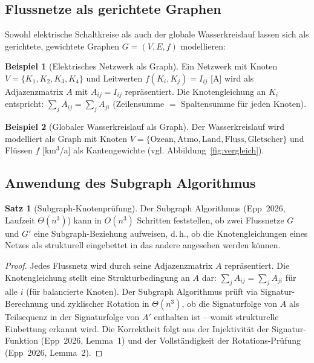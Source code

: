 ﻿\documentclass[a4paper,12pt]{article}
\theoremstyle{definition}
\newtheorem{beispiel}{Beispiel}
\newtheorem{satz}{Satz}
\begin{document}
\subsection{Flussnetze als gerichtete Graphen}

Sowohl elektrische Schaltkreise als auch der globale Wasserkreislauf
lassen sich als gerichtete, gewichtete Graphen $G = (V, E, f)$ modellieren:

\begin{beispiel}[Elektrisches Netzwerk als Graph]
  Ein Netzwerk mit Knoten $V = \{K_1, K_2, K_3, K_4\}$ und Leitwerten
  $f(K_i, K_j) = I_{ij}$ [A] wird als Adjazenzmatrix $A$ mit $A_{ij} = I_{ij}$
  repräsentiert. Die Knotengleichung an $K_i$ entspricht:
  $\sum_j A_{ij} = \sum_j A_{ji}$ (Zeilensumme $=$ Spaltensumme für
  jeden Knoten).
\end{beispiel}

\begin{beispiel}[Globaler Wasserkreislauf als Graph]
  Der Wasserkreislauf wird modelliert als Graph mit Knoten
  $V = \{\mathrm{Ozean}, \mathrm{Atmo}, \mathrm{Land}, \mathrm{Fluss},
  \mathrm{Gletscher}\}$ und Flüssen $f$ [km$^3$/a] als Kantengewichte
  (vgl. Abbildung~\ref{fig:vergleich}).
\end{beispiel}

\subsection{Anwendung des Subgraph Algorithmus}

\begin{satz}[Subgraph-Knotenprüfung]
  \label{satz:subgraph}
  Der Subgraph Algorithmus (Epp~2026, Laufzeit $\Theta(n^3)$) kann in
  $O(n^3)$ Schritten feststellen, ob zwei Flussnetze $G$ und $G'$ eine
  Subgraph-Beziehung aufweisen, d.\,h., ob die Knotengleichungen eines
  Netzes als strukturell eingebettet in das andere angesehen werden können.
\end{satz}

\begin{proof}
  Jedes Flussnetz wird durch seine Adjazenzmatrix $A$ repräsentiert.
  Die Knotengleichung stellt eine Struktur\-bedingung an $A$ dar:
  $\sum_j A_{ij} = \sum_j A_{ji}$ für alle $i$ (für balancierte Knoten).
  Der Subgraph Algorithmus prüft via Signatur-Berechnung und zyklischer
  Rotation in $\Theta(n^3)$, ob die Signaturfolge von $A$ als Teilsequenz
  in der Signaturfolge von $A'$ enthalten ist -- womit strukturelle
  Einbettung erkannt wird. Die Korrektheit folgt aus der Injektivität
  der Signatur-Funktion (Epp~2026, Lemma~1) und der Vollständigkeit
  der Rotations-Prüfung (Epp~2026, Lemma~2). \qedhere
\end{proof}
\end{document}
